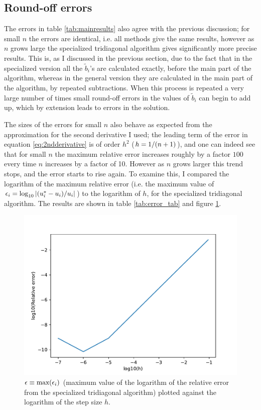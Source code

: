 \documentclass[a4paper,english]{article}
\newcommand\norm[1]{\left\lvert#1\right\rvert}
\let\originalleft\left
\let\originalright\right
\renewcommand{\left}{\mathopen{}\mathclose\bgroup\originalleft}
\renewcommand{\right}{\aftergroup\egroup\originalright}
\begin{document}
\subsection{Round-off errors}
The errors in table \ref{tab:mainresults} also agree with the previous discussion; for small $n$ the errors are identical, i.e. all methods give the same results, however as $n$ grows large the specialized tridiagonal algorithm gives significantly more precise results. This is, as  I discussed in the previous section, due to the fact that in the specialized version all the $\tilde{b}_i$'s are calculated exactly, before the main part of the algorithm, whereas in the general version they are calculated in the main part of the algorithm, by repeated subtractions. When this process is repeated a very large number of times small round-off errors in the values of $\tilde{b}_i$ can begin to add up, which by extension leads to errors in the solution. \par
The sizes of the errors for small $n$ also behave as expected from the approximation for the second derivative I used; the leading term of the error in equation \ref{eq:2ndderivative} is of order $h^2$\cite{lecturenotes} ($h=1/\left(n+1\right)$), and one can indeed see that for small $n$ the maximum relative error increases roughly by a factor $100$ every time $n$ increases by a factor of 10. However as $n$ grows larger this trend stops, and the error starts to rise again. To examine this, I compared the logarithm of the maximum relative error (i.e. the maximum value of $\epsilon_i = \log_{10}{\norm{\left(u^*_i-u_i\right)/u_i}}$) to the logarithm of $h$, for the specialized tridiagonal algorithm. The results are shown in table \ref{tab:error_tab} and figure \ref{fig:error_plot}. \par
\begin{figure}[ht]
  \centering
  \includegraphics[width=0.84\linewidth]{error_plot.pdf}
  \caption{$\epsilon \equiv \text{max}\left(\epsilon_i\right)$ (maximum value of the logarithm of the relative error from the specialized tridiagonal algorithm) plotted against the logarithm of the step size $h$.}
  \label{fig:error_plot}
\end{figure}
\end{document}
